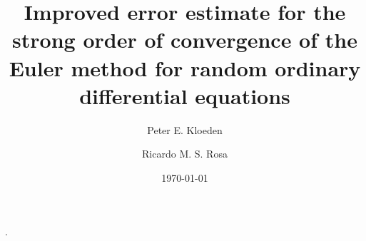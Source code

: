 \documentclass[reqno,12pt]{amsart}
\theoremstyle{plain}%
\theoremstyle{definition}
\begin{document}


\title[Strong order convergence of Euler for Random ODEs]{Improved error estimate for the strong order of convergence of the Euler method for random ordinary differential equations}

\author[P. E. Kloeden]{Peter E. Kloeden}
\author[R. M. S. Rosa]{Ricardo M. S. Rosa}

\address[Peter E. Kloeden]{Mathematics Department, University of Tubingen, Germany}
\address[Ricardo M. S. Rosa]{Instituto de Matem\'atica, Universidade Federal do Rio de Janeiro, Brazil}


\date{\today}


.
\end{document}
